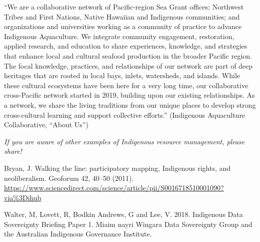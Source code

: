 \documentclass[
  11pt,
  paperpaper,
  openany]{book}
\begin{document}
``We are a collaborative network of Pacific-region Sea Grant offices; Northwest Tribes and First Nations, Native Hawaiian and Indigenous communities; and organizations and universities working as a community of practice to advance Indigenous Aquaculture. We integrate community engagement, restoration, applied research, and education to share experiences, knowledge, and strategies that enhance local and cultural seafood production in the broader Pacific region. The focal knowledge, practices, and relationships of our network are part of deep heritages that are rooted in local bays, inlets, watersheds, and islands. While these cultural ecosystems have been here for a very long time, our collaborative cross-Pacific network started in 2019, building upon our existing relationships. As a network, we share the living traditions from our unique places to develop strong cross-cultural learning and support collective efforts.'' (Indigenous Aquaculture Collaborative, ``About Us'')

\emph{If you are aware of other examples of Indigenous resource management, please share!}

Bryan, J. Walking the line: participatory mapping, Indigenous rights, and neoliberalism. Geoforum 42, 40--50 (2011). \url{https://www.sciencedirect.com/science/article/pii/S0016718510001090?via\%3Dihub}

Walter, M, Lovett, R, Bodkin Andrews, G and Lee, V. 2018. Indigenous Data Sovereignty Briefing Paper 1. Miaim nayri Wingara Data Sovereignty Group and the Australian Indigenous Governance Institute.

  
\end{document}
